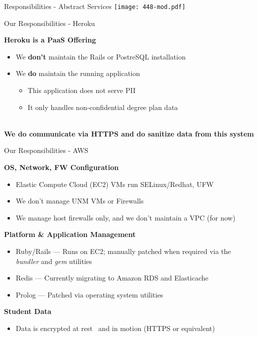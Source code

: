 \documentclass[t,handout]{beamer}   %
\begin{document}
\begin{frame}{Responsibilities - Abstract Services}
 	\texttt{[image: 448-mod.pdf]}
\end{frame}

\begin{frame}{Our Responsibilities - Heroku}

\textbf{Heroku is a PaaS Offering}
{\small
\begin{itemize}
\item We \textbf{don't} maintain the Rails or PostreSQL installation
\item We \textbf{do} maintain the running application
\begin{itemize}
\item This application does not serve PII
\item It only handles non-confidential degree plan data
\end{itemize}
\end{itemize}
}
~\\
\centering
\textbf{We do communicate via HTTPS and do sanitize data from this system}

\end{frame}

\begin{frame}{Our Responsibilities - AWS}

\textbf{OS, Network, FW Configuration}
{\small
\begin{itemize}
\item Elastic Compute Cloud (EC2) VMs run SELinux/Redhat, UFW
\item We don't manage UNM VMs or Firewalls
\item We manage host firewalls only, and we don't maintain a VPC (for now)
\end{itemize}
}

\pause

\textbf{Platform \& Application Management}
{\small
\begin{itemize}
\item Ruby/Rails --- Runs on EC2; manually patched when required via the \textit{bundler} and \textit{gem} utilities
\item Redis --- Currently migrating to Amazon RDS and Elasticache
\item Prolog --- Patched via operating system utilities
\end{itemize}
}

\pause

\textbf{Student Data}
{\small
\begin{itemize}
\item Data is encrypted at rest~ and in motion (HTTPS or equivalent)
\end{itemize}
}

\end{frame}
\end{document}
